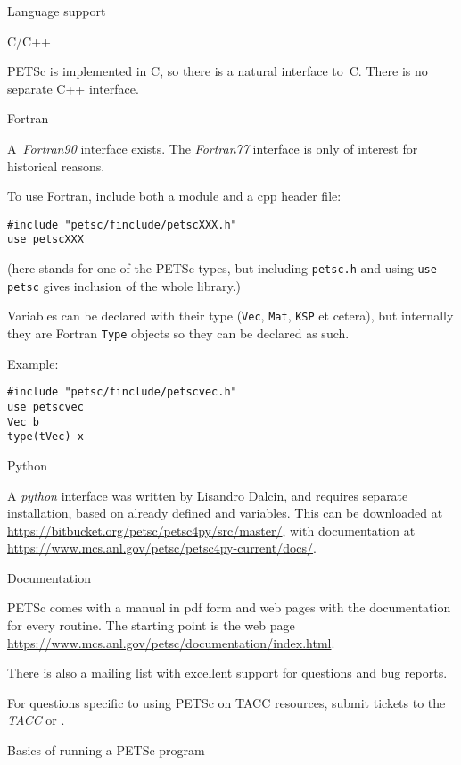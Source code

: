  {Language support}

 {C/C++}

PETSc is implemented in C, so there is a natural interface
to~C. There is no separate C++ interface.

 {Fortran}

A~\emph{Fortran90}
interface exists. The \emph{Fortran77}
interface is only of
interest for historical reasons.

To use Fortran, include both a module and a cpp header file:
\begin{verbatim}
#include "petsc/finclude/petscXXX.h"
use petscXXX
\end{verbatim}
(here  stands for one of the PETSc types, but including
\lstinline{petsc.h} and using \lstinline{use petsc}
gives inclusion of the whole library.)

Variables can be declared with their type (\lstinline{Vec},
\lstinline{Mat}, \lstinline{KSP} et cetera), but internally they are
Fortran \lstinline{Type} objects so they can be declared as such.

Example:
\begin{lstlisting}
#include "petsc/finclude/petscvec.h"
use petscvec
Vec b
type(tVec) x
\end{lstlisting}

 {Python}

A \emph{python} interface was written by
Lisandro Dalcin, and requires separate installation, based on already
defined  and 
variables.  This can be downloaded at
\url{https://bitbucket.org/petsc/petsc4py/src/master/}, with
documentation at
\url{https://www.mcs.anl.gov/petsc/petsc4py-current/docs/}.

 {Documentation}

PETSc comes with a manual in pdf form and web pages with the
documentation for every routine. The starting point is the web page
\url{https://www.mcs.anl.gov/petsc/documentation/index.html}.

There is also a mailing list with excellent support for questions and
bug reports.
\begin{taccnote}
  For questions specific to using PETSc on TACC resources, submit
  tickets to the \emph{TACC} or
  .
\end{taccnote}

 {Basics of running a PETSc program}

